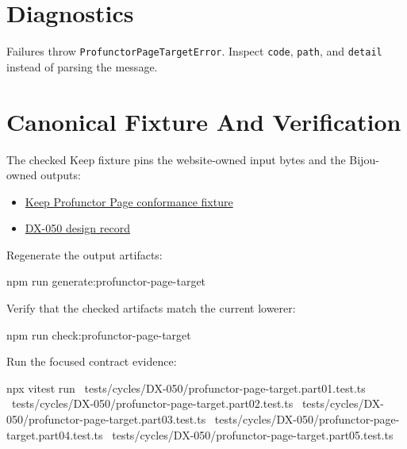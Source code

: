 \section{Diagnostics}\label{record-025-diagnostics}

Failures throw \texttt{P\allowbreak{}r\allowbreak{}o\allowbreak{}f\allowbreak{}u\allowbreak{}n\allowbreak{}c\allowbreak{}t\allowbreak{}o\allowbreak{}r\allowbreak{}P\allowbreak{}a\allowbreak{}g\allowbreak{}e\allowbreak{}T\allowbreak{}a\allowbreak{}r\allowbreak{}g\allowbreak{}e\allowbreak{}t\allowbreak{}E\allowbreak{}r\allowbreak{}r\allowbreak{}o\allowbreak{}r}. Inspect \texttt{c\allowbreak{}o\allowbreak{}d\allowbreak{}e}, \texttt{p\allowbreak{}a\allowbreak{}t\allowbreak{}h}, and \texttt{d\allowbreak{}e\allowbreak{}t\allowbreak{}a\allowbreak{}i\allowbreak{}l} instead of parsing the message.



\section{Canonical Fixture And Verification}\label{record-025-canonical-fixture-and-verification}

The checked Keep fixture pins the website-owned input bytes and the Bijou-owned outputs:

\begin{itemize}
\tightlist
\item
  \href{https://github.com/flyingrobots/bijou/blob/cbd70612140e7a450d764b3c7be1c6af878b99bc/fixtures/profunctor-page/project-keep/README.md}{Keep Profunctor Page conformance fixture}
\item
  \href{https://github.com/flyingrobots/bijou/blob/cbd70612140e7a450d764b3c7be1c6af878b99bc/docs/design/DX-050-profunctor-page-inspection.md}{DX-050 design record}
\end{itemize}

Regenerate the output artifacts:

\begin{CodeBlock}
npm run generate:profunctor-page-target
\end{CodeBlock}

Verify that the checked artifacts match the current lowerer:

\begin{CodeBlock}
npm run check:profunctor-page-target
\end{CodeBlock}

Run the focused contract evidence:

\begin{CodeBlock}
npx vitest run \
  tests/cycles/DX-050/profunctor-page-target.part01.test.ts \
  tests/cycles/DX-050/profunctor-page-target.part02.test.ts \
  tests/cycles/DX-050/profunctor-page-target.part03.test.ts \
  tests/cycles/DX-050/profunctor-page-target.part04.test.ts \
  tests/cycles/DX-050/profunctor-page-target.part05.test.ts
\end{CodeBlock}

